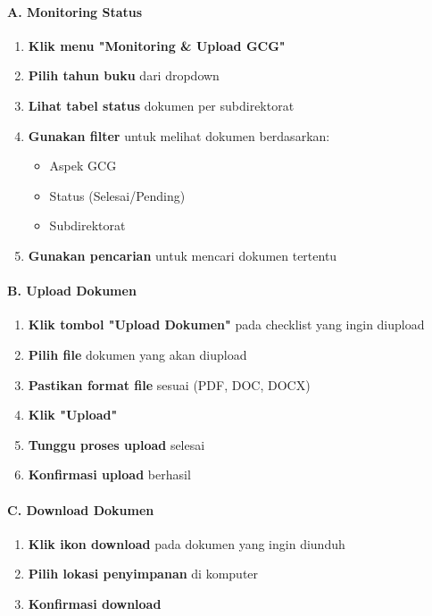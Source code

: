 \documentclass[12pt,a4paper]{article}
\begin{document}
\paragraph{A. Monitoring Status}
\begin{enumerate}
    \item \textbf{Klik menu "Monitoring \& Upload GCG"}
    \item \textbf{Pilih tahun buku} dari dropdown
    \item \textbf{Lihat tabel status} dokumen per subdirektorat
    \item \textbf{Gunakan filter} untuk melihat dokumen berdasarkan:
    \begin{itemize}
        \item Aspek GCG
        \item Status (Selesai/Pending)
        \item Subdirektorat
    \end{itemize}
    \item \textbf{Gunakan pencarian} untuk mencari dokumen tertentu
\end{enumerate}

\paragraph{B. Upload Dokumen}
\begin{enumerate}
    \item \textbf{Klik tombol "Upload Dokumen"} pada checklist yang ingin diupload
    \item \textbf{Pilih file} dokumen yang akan diupload
    \item \textbf{Pastikan format file} sesuai (PDF, DOC, DOCX)
    \item \textbf{Klik "Upload"}
    \item \textbf{Tunggu proses upload} selesai
    \item \textbf{Konfirmasi upload} berhasil
\end{enumerate}

\paragraph{C. Download Dokumen}
\begin{enumerate}
    \item \textbf{Klik ikon download} pada dokumen yang ingin diunduh
    \item \textbf{Pilih lokasi penyimpanan} di komputer
    \item \textbf{Konfirmasi download}
\end{enumerate}
\end{document}
